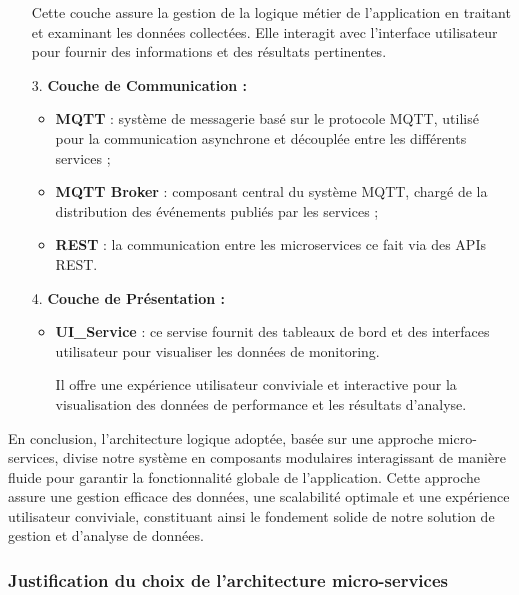 \begin{enumerate}
\begin{itemize}
            \end{itemize}
                \par Cette couche assure la gestion de la logique métier de l'application en traitant et examinant les données collectées.
                Elle interagit avec l'interface utilisateur pour fournir des informations et des résultats pertinentes.
        \item[3.] \textbf{Couche de Communication : }
                \begin{itemize}
                    \item \textbf{MQTT} : système de messagerie basé sur le protocole MQTT, utilisé pour la communication asynchrone et découplée entre les différents services ;
                    \item \textbf{MQTT Broker} : composant central du système MQTT, chargé de la distribution des événements publiés par les services ;
                    \item \textbf{REST} : la communication entre les microservices ce fait via des APIs REST.
                \end{itemize}
            
        \item[4.] \textbf{Couche de Présentation  :}
            \begin{itemize}
                \item \textbf{UI\_Service} : ce servise fournit des tableaux de bord et des interfaces utilisateur pour visualiser les données de monitoring.
                \par Il offre une expérience utilisateur conviviale et interactive pour la visualisation des données de performance et les résultats d'analyse.
            \end{itemize}
    \end{enumerate}
    \par En conclusion, l'architecture logique adoptée, basée sur une approche micro-services, divise notre système en composants modulaires interagissant de manière fluide pour garantir la fonctionnalité globale de l'application. 
    Cette approche assure une gestion efficace des données, une scalabilité optimale et une expérience utilisateur conviviale, constituant ainsi le fondement solide de notre solution de gestion et d'analyse de données.
\subsubsection{Justification du choix de l'architecture micro-services}

